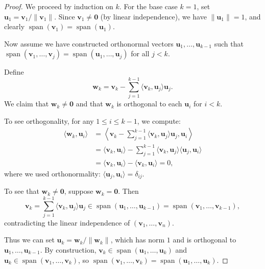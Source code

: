\begin{proof}
  We proceed by induction on $k$. For the base case $k=1$, set $\mathbf{u}_1 = \mathbf{v}_1 / \|\mathbf{v}_1\|$.
  Since $\mathbf{v}_1 \neq \mathbf{0}$ (by linear independence), we have $\|\mathbf{u}_1\| = 1$,
  and clearly $\operatorname{span}(\mathbf{v}_1) = \operatorname{span}(\mathbf{u}_1)$.

  Now assume we have constructed orthonormal vectors $\mathbf{u}_1,\dots,\mathbf{u}_{k-1}$ such that
  $\operatorname{span}(\mathbf{v}_1,\dots,\mathbf{v}_j) = \operatorname{span}(\mathbf{u}_1,\dots,\mathbf{u}_j)$ for all $j < k$.

  Define
  \[
    \mathbf{w}_k = \mathbf{v}_k - \sum_{j=1}^{k-1} \langle \mathbf{v}_k, \mathbf{u}_j \rangle \mathbf{u}_j.
  \]
  We claim that $\mathbf{w}_k \neq \mathbf{0}$ and that $\mathbf{w}_k$ is orthogonal to each $\mathbf{u}_i$ for $i < k$.

  To see orthogonality, for any $1 \leq i \leq k-1$, we compute:
  \begin{align*}
    \langle \mathbf{w}_k, \mathbf{u}_i \rangle
     & = \left\langle \mathbf{v}_k - \sum_{j=1}^{k-1} \langle \mathbf{v}_k, \mathbf{u}_j \rangle \mathbf{u}_j, \mathbf{u}_i \right\rangle                    \\
     & = \langle \mathbf{v}_k, \mathbf{u}_i \rangle - \sum_{j=1}^{k-1} \langle \mathbf{v}_k, \mathbf{u}_j \rangle \langle \mathbf{u}_j, \mathbf{u}_i \rangle \\
     & = \langle \mathbf{v}_k, \mathbf{u}_i \rangle - \langle \mathbf{v}_k, \mathbf{u}_i \rangle = 0,
  \end{align*}
  where we used orthonormality: $\langle \mathbf{u}_j, \mathbf{u}_i \rangle = \delta_{ij}$.

  To see that $\mathbf{w}_k \neq \mathbf{0}$, suppose $\mathbf{w}_k = \mathbf{0}$. Then
  \[
    \mathbf{v}_k = \sum_{j=1}^{k-1} \langle \mathbf{v}_k, \mathbf{u}_j \rangle \mathbf{u}_j \in \operatorname{span}(\mathbf{u}_1,\dots,\mathbf{u}_{k-1}) = \operatorname{span}(\mathbf{v}_1,\dots,\mathbf{v}_{k-1}),
  \]
  contradicting the linear independence of $(\mathbf{v}_1,\dots,\mathbf{v}_n)$.

  Thus we can set $\mathbf{u}_k = \mathbf{w}_k / \|\mathbf{w}_k\|$, which has norm $1$ and is orthogonal to $\mathbf{u}_1,\dots,\mathbf{u}_{k-1}$.
  By construction, $\mathbf{v}_k \in \operatorname{span}(\mathbf{u}_1,\dots,\mathbf{u}_k)$ and $\mathbf{u}_k \in \operatorname{span}(\mathbf{v}_1,\dots,\mathbf{v}_k)$,
  so $\operatorname{span}(\mathbf{v}_1,\dots,\mathbf{v}_k) = \operatorname{span}(\mathbf{u}_1,\dots,\mathbf{u}_k)$.
\end{proof}

